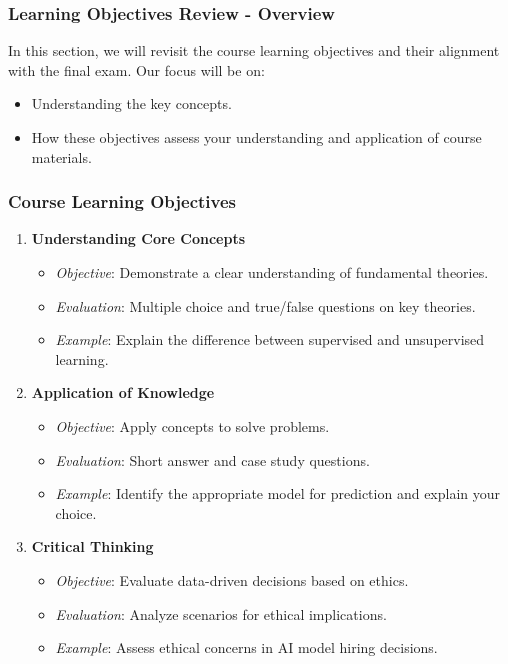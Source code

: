\documentclass[aspectratio=169]{beamer}
\begin{document}
\begin{frame}[fragile]
    \frametitle{Learning Objectives Review - Overview}
    In this section, we will revisit the course learning objectives and their alignment with the final exam. Our focus will be on:
    \begin{itemize}
        \item Understanding the key concepts.
        \item How these objectives assess your understanding and application of course materials.
    \end{itemize}
\end{frame}

\begin{frame}[fragile]
    \frametitle{Course Learning Objectives}
    \begin{enumerate}
        \item \textbf{Understanding Core Concepts}
        \begin{itemize}
            \item \textit{Objective}: Demonstrate a clear understanding of fundamental theories.
            \item \textit{Evaluation}: Multiple choice and true/false questions on key theories.
            \item \textit{Example}: Explain the difference between supervised and unsupervised learning.
        \end{itemize}

        \item \textbf{Application of Knowledge}
        \begin{itemize}
            \item \textit{Objective}: Apply concepts to solve problems.
            \item \textit{Evaluation}: Short answer and case study questions.
            \item \textit{Example}: Identify the appropriate model for prediction and explain your choice.
        \end{itemize}

        \item \textbf{Critical Thinking}
        \begin{itemize}
            \item \textit{Objective}: Evaluate data-driven decisions based on ethics.
            \item \textit{Evaluation}: Analyze scenarios for ethical implications.
            \item \textit{Example}: Assess ethical concerns in AI model hiring decisions.
        \end{itemize}


\end{enumerate}
\end{frame}
\end{document}
